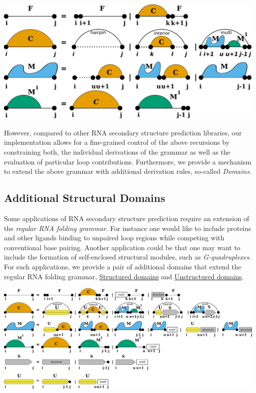  
\begin{DoxyImageNoCaption}
  \mbox{\includegraphics[width=\textwidth,height=\textheight/2,keepaspectratio=true]{recursions}}
\end{DoxyImageNoCaption}


However, compared to other R\+NA secondary structure prediction libraries, our implementation allows for a fine-\/grained control of the above recursions by constraining both, the individual derivations of the grammar as well as the evaluation of particular loop contributions. Furthermore, we provide a mechanism to extend the above grammar with additional derivation rules, so-\/called {\itshape Domains}.\hypertarget{folding_grammar_sec_domains}{}\subsection{Additional Structural Domains}\label{folding_grammar_sec_domains}
Some applications of R\+NA secondary structure prediction require an extension of the {\itshape regular R\+NA folding grammar}. For instance one would like to include proteins and other ligands binding to unpaired loop regions while competing with conventional base pairing. Another application could be that one may want to include the formation of self-\/enclosed structural modules, such as {\itshape G-\/quadruplexes}. For such applications, we provide a pair of additional domains that extend the regular R\+NA folding grammar, \hyperlink{group__domains__struc}{Structured domains} and \hyperlink{group__domains__up}{Unstructured domains}.

 
\begin{DoxyImageNoCaption}
  \mbox{\includegraphics[width=\textwidth,height=\textheight/2,keepaspectratio=true]{GCrecursion}}
\end{DoxyImageNoCaption}


